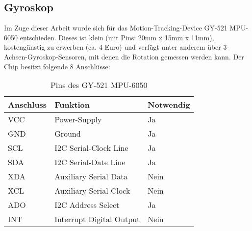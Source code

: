 \subsection{Gyroskop}
Im Zuge dieser Arbeit wurde sich für das Motion-Tracking-Device GY-521 MPU-6050 entschieden.
Dieses ist klein (mit Pins: 20mm x 15mm x 11mm), kostengünstig zu erwerben (ca. 4 Euro) und verfügt unter anderem über 3-Achsen-Gyroskop-Sensoren, mit denen die Rotation gemessen werden kann.
Der Chip besitzt folgende 8 Anschlüsse:

\begin{table}[h]
    \centering
    \begin{threeparttable}
        \caption{Pins des GY-521 MPU-6050\cite{az-delivery_vertriebs_gmbhGY5216AchsenGyroskop}}
        \begin{tabular}{|l|l|l|}
            \hline
            \textbf{Anschluss}          & \textbf{Funktion}        & \textbf{Notwendig} \\ \hline
            \parbox[c][0.5cm]{2cm}{VCC} & Power-Supply             & Ja                 \\ \hline
            \parbox[c][0.5cm]{2cm}{GND} & Ground                   & Ja                 \\ \hline
            \parbox[c][0.5cm]{2cm}{SCL} & I2C Serial-Clock Line    & Ja                 \\ \hline
            \parbox[c][0.5cm]{2cm}{SDA} & I2C Serial-Date Line     & Ja                 \\ \hline
            \parbox[c][0.5cm]{2cm}{XDA} & Auxiliary Serial Data    & Nein               \\ \hline
            \parbox[c][0.5cm]{2cm}{XCL} & Auxiliary Serial Clock   & Nein               \\ \hline
            \parbox[c][0.5cm]{2cm}{ADO} & I2C Address Select       & Ja                 \\ \hline
            \parbox[c][0.5cm]{2cm}{INT} & Interrupt Digital Output & Nein               \\ \hline
        \end{tabular}
    \end{threeparttable}
\end{table}

